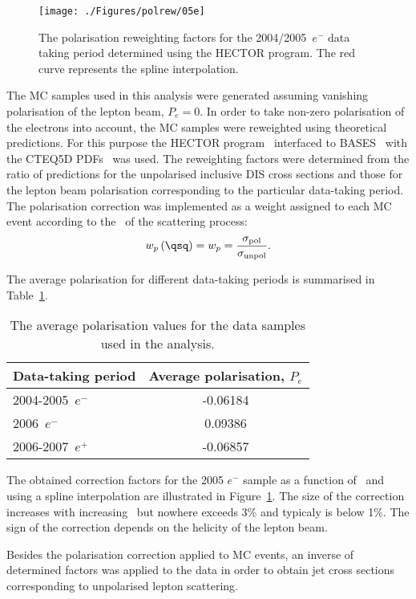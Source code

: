 \label{sec:polcor}
\begin{figure}[h]
 \begin{center}
 \texttt{[image: ./Figures/polrew/05e]}
\end{center}
\caption{The polarisation reweighting factors for the 2004/2005~$e^-$ data taking period determined using the HECTOR program. The red curve represents the spline interpolation.}
\label{fig:polcor05e}
\end{figure} 
The MC samples used in this analysis were generated assuming vanishing polarisation of the lepton beam, $P_e = 0$. In order to take non-zero polarisation of the electrons into account, the MC samples were reweighted using theoretical predictions. For this purpose the HECTOR program~\cite{cpc:94:128} interfaced to BASES~\cite{upub:Nagano:url} with the CTEQ5D PDFs~\cite{pr:d51:4763} was used. The reweighting factors were determined from the ratio of predictions for the unpolarised inclusive DIS cross sections and those for the lepton beam polarisation corresponding to the particular data-taking period. The polarisation correction was implemented as a weight assigned to each MC event according to the \qsq~of the scattering process:
\begin{equation}
 w_p\left(\qsq\right) = w_p = \frac{\sigma_\mathrm{pol}}{\sigma_\mathrm{unpol}}.
\end{equation}

The average polarisation for different data-taking periods is summarised in Table~\ref{tab:polvalues}.
\begin{table}[h]
 \centering
 \begin{tabular}{lc}
 Data-taking period & Average polarisation, $P_e$ \\
\hline
 2004-2005~$e^-$   & -0.06184 \\
 2006~$e^-$   & 0.09386  \\
 2006-2007~$e^+$ & -0.06857
\end{tabular} 
\caption{The average polarisation values for the data samples used in the analysis.}
\label{tab:polvalues}
\end{table}
The obtained correction factors for the 2005 $e^-$ sample as a function of \qsq~and using a spline interpolation are illustrated in Figure~\ref{fig:polcor05e}. The size of the correction increases with increasing \qsq~but nowhere exceeds 3\% and typicaly is below 1\%. The sign of the correction depends on the helicity of the lepton beam.

Besides the polarisation correction applied to MC events, an inverse of determined factors was applied to the data in order to obtain jet cross sections corresponding to unpolarised lepton scattering.